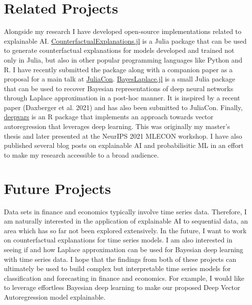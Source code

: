 \documentclass[
]{acmconf}
\begin{document}
\hypertarget{sec-related}{%
\section{Related Projects}\label{sec-related}}

Alongside my research I have developed open-source implementations
related to explainable AI.
\href{https://www.paltmeyer.com/CounterfactualExplanations.jl/stable/}{CounterfactualExplanations.jl}
is a Julia package that can be used to generate counterfactual
explanations for models developed and trained not only in Julia, but
also in other popular programming languages like Python and R. I have
recently submitted the package along with a companion paper as a
proposal for a main talk at \href{https://juliacon.org/2022/}{JuliaCon}.
\href{https://www.paltmeyer.com/BayesLaplace.jl/dev/}{BayesLaplace.jl}
is a small Julia package that can be used to recover Bayesian
representations of deep neural networks through Laplace approximation in
a post-hoc manner. It is inspired by a recent paper (Daxberger et al.
2021) and has also been submitted to JuliaCon. Finally,
\href{https://github.com/pat-alt/deepvars}{deepvars} is an R package
that implements an approach towards vector autoregression that leverages
deep learning. This was originally my master's thesis and later
presented at the NeurIPS 2021 MLECON workshop. I have also published
several blog posts on explainable AI and probabilisitic ML in an effort
to make my research accessible to a broad audience.

\hypertarget{sec-future}{%
\section{Future Projects}\label{sec-future}}

Data sets in finance and economics typically involve time series data.
Therefore, I am naturally interested in the application of explainable
AI to sequential data, an area which has so far not been explored
extensively. In the future, I want to work on counterfactual
explanations for time series models. I am also interested in seeing if
and how Laplace approximation can be used for Bayesian deep learning
with time series data. I hope that the findings from both of these
projects can ultimately be used to build complex but interpretable time
series models for classification and forecasting in finance and
economics. For example, I would like to leverage effortless Bayesian
deep learning to make our proposed Deep Vector Autoregression model
explainable.
\end{document}
